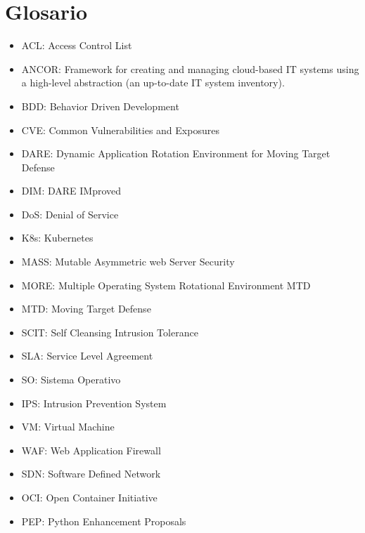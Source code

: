 \chapter{Glosario}

\begin{itemize}
    \item ACL: Access Control List
    \item ANCOR: Framework for creating and managing cloud-based IT systems using a high-level abstraction (an up-to-date IT system inventory).
    \item BDD: Behavior Driven Development
    \item CVE: Common Vulnerabilities and Exposures
    \item DARE: Dynamic Application Rotation Environment for Moving Target Defense
    \item DIM: DARE IMproved
    \item DoS: Denial of Service
    \item K8s: Kubernetes
    \item MASS: Mutable Asymmetric web Server Security
    \item MORE: Multiple Operating System Rotational Environment MTD
    \item MTD: Moving Target Defense
    \item SCIT: Self Cleansing Intrusion Tolerance
    \item SLA: Service Level Agreement
    \item SO: Sistema Operativo
    \item IPS: Intrusion Prevention System
    \item VM: Virtual Machine
    \item WAF: Web Application Firewall
    \item SDN: Software Defined Network
    \item OCI: Open Container Initiative
    \item PEP: Python Enhancement Proposals
  \end{itemize}
  